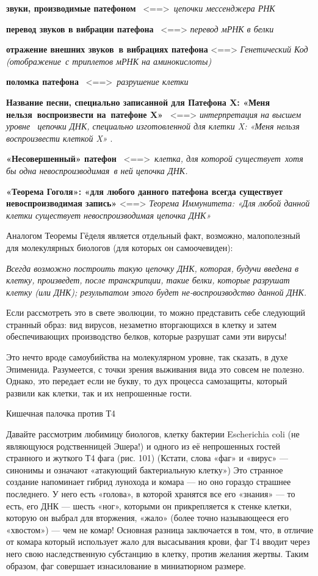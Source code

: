 \documentclass[../main.tex]{subfiles}
\begin{document}
\textbf{звуки, производимые патефоном} ~\textless==\textgreater~\emph{цепочки мессенджера РНК}

\textbf{перевод звуков в вибрации патефона} ~\textless==\textgreater{} \emph{перевод мРНК в белки}

\textbf{отражение внешних звуков~в вибрациях патефона} \textless==\textgreater{} \emph{Генетический Код (отображение~с триплетов мРНК на аминокислоты)}

\textbf{поломка патефона} ~\textless==\textgreater~\emph{разрушение клетки}

\textbf{Название песни, специально записанной для Патефона X: «Меня нельзя~воспроизвести на~патефоне X»} ~\textless==\textgreater{} \emph{интерпретация на высшем уровне ~цепочки ДНК, специально изготовленной для клетки X: «Меня нельзя воспроизвести клеткой X»} .

\textbf{«Несовершенный» патефон} ~\textless==\textgreater~\emph{клетка, для которой существует~хотя бы одна невоспроизводимая~в ней цепочка ДНК.}

\textbf{«Теорема Гоголя»: «для любого данного патефона всегда существует невоспроизводимая запись»} \textless==\textgreater{} \emph{Теорема Иммунитета: «Для любой данной клетки существует невоспроизводимая цепочка ДНК»}

Аналогом Теоремы Гёделя является отдельный факт, возможно, малополезный для молекулярных биологов (для которых он самоочевиден):

\emph{Всегда возможно построить такую цепочку ДНК, которая, будучи введена в клетку, произведет, после транскрипции, такие белки, которые разрушат клетку (или ДНК); результатом этого будет не-воспроизводство данной ДНК.}

Если рассмотреть это в свете эволюции, то можно представить себе следующий странный образ: вид вирусов, незаметно вторгающихся в клетку и затем обеспечивающих производство белков, которые разрушат сами эти вирусы!

Это нечто вроде самоубийства на молекулярном уровне, так сказать, в духе Эпименида. Разумеется, с точки зрения выживания вида это совсем не полезно. Однако, это передает если не букву, то дух процесса самозащиты, который развили как клетки, так и их непрошенные гости.

Кишечная палочка против Т4

Давайте рассмотрим любимицу биологов, клетку бактерии Escherichia coli (не являющуюся родственницей Эшера!) и одного из её непрошенных гостей странного и жуткого Т4 фага (рис. 101) (Кстати, слова «фаг» и «вирус» --- синонимы и означают «атакующий бактериальную клетку») Это странное создание напоминает гибрид лунохода и комара --- но оно гораздо страшнее последнего. У него есть «голова», в которой хранятся все его «знания» --- то есть, его ДНК --- шесть «ног», которыми он прикрепляется к стенке клетки, которую он выбрал для вторжения, «жало» (более точно называющееся его «хвостом») --- чем не комар! Основная разница заключается в том, что, в отличие от комара который использует жало для высасывания крови, фаг Т4 вводит через него свою наследственную субстанцию в клетку, против желания жертвы. Таким образом, фаг совершает изнасилование в миниатюрном размере.
\end{document}

